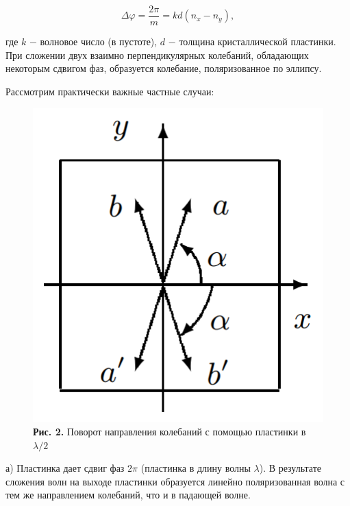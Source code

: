 \documentclass[a4paper,12pt]{article} %
\begin{document}
\begin{equation}\label{ linkname }
\Delta \varphi = \frac{2\pi} {m} = kd(n_{x} - n_{y}),
\end{equation}

\hfill \break где $k$ $-$ волновое число (в пустоте), $d$ $-$ толщина кристаллической пластинки. При сложении двух взаимно перпендикулярных колебаний, обладающих некоторым сдвигом фаз, образуется колебание, поляризованное по эллипсу.

\hfill \break Рассмотрим практически важные частные случаи:

\begin{figure}
\begin{center}
    \includegraphics[width=1\textwidth]{4.7.3_2.png}
    \textbf{Рис. 2.} Поворот направления колебаний с помощью пластинки в $\lambda/2$
\end{center}
\end{figure}

\hfill \break а) Пластинка дает сдвиг фаз $2\pi$ (пластинка в длину волны $\lambda$). В результате сложения волн на выходе пластинки образуется линейно поляризованная волна с тем же направлением колебаний, что и в падающей волне.
\end{document}
